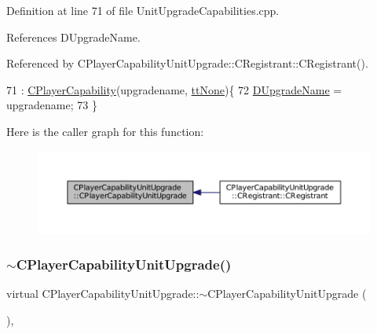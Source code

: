Definition at line 71 of file Unit\+Upgrade\+Capabilities.\+cpp.



References D\+Upgrade\+Name.



Referenced by C\+Player\+Capability\+Unit\+Upgrade\+::\+C\+Registrant\+::\+C\+Registrant().


\begin{DoxyCode}
71                                                                                        : 
      \hyperlink{classCPlayerCapability_a303de62aba5d3f65d9a8e013c64a96c1}{CPlayerCapability}(upgradename, \hyperlink{classCPlayerCapability_a9d3450ed1532fd536bd6cbb1e2eef02fac78f0e806a6b0ead030d63c27c9ce929}{ttNone})\{
72     \hyperlink{classCPlayerCapabilityUnitUpgrade_a5de8bffd6935c699f431329ad4ee5eec}{DUpgradeName} = upgradename;
73 \}
\end{DoxyCode}
Here is the caller graph for this function\+:\nopagebreak
\begin{figure}[H]
\begin{center}
\leavevmode
\includegraphics[width=350pt]{classCPlayerCapabilityUnitUpgrade_ac87129322f9f31cc271ee3de33502c56_icgraph}
\end{center}
\end{figure}
\hypertarget{classCPlayerCapabilityUnitUpgrade_a7784e1fb92a26acb700c06ab38d2733b}{}\label{classCPlayerCapabilityUnitUpgrade_a7784e1fb92a26acb700c06ab38d2733b} 
\subsubsection{\texorpdfstring{$\sim$\+C\+Player\+Capability\+Unit\+Upgrade()}{~CPlayerCapabilityUnitUpgrade()}}
{\footnotesize\ttfamily virtual C\+Player\+Capability\+Unit\+Upgrade\+::$\sim$\+C\+Player\+Capability\+Unit\+Upgrade (\begin{DoxyParamCaption}{ }\end{DoxyParamCaption})\hspace{0.3cm}{\ttfamily [inline]}, {\ttfamily [virtual]}}



